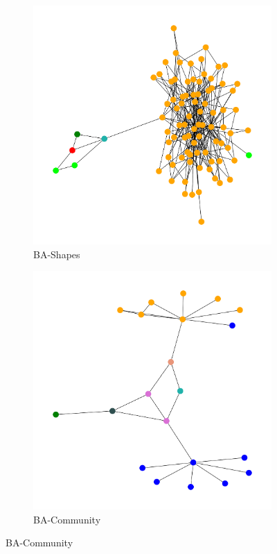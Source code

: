 \begin{figure}[H]
    \centering
    \begin{subfigure}[b]{0.4\textwidth}
        \includegraphics[width=\textwidth]{img/BA-Shapes-VIS-COMP-GRAPH.pdf}
        \caption{BA-Shapes}
    \end{subfigure}
    \hfill
    \begin{subfigure}[b]{0.4\textwidth}
        \includegraphics[width=\textwidth]{img/BA-Community-VIS-COMP-GRAPH.pdf}
        \caption{BA-Community}
    \end{subfigure}
    

\end{figure}
